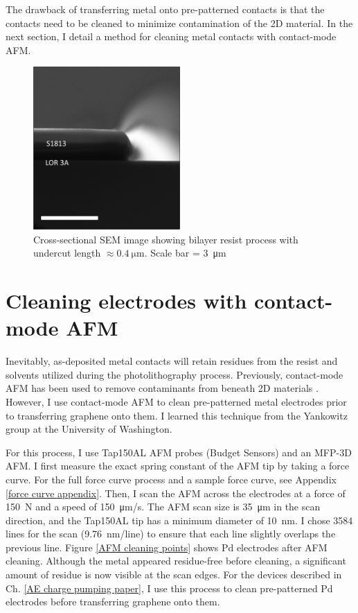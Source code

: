 \documentclass[double,12pt,1in]{beavtex}
\begin{document}
The drawback of transferring metal onto pre-patterned contacts is that the contacts need to be cleaned to minimize contamination of the 2D material. In the next section, I detail a method for cleaning metal contacts with contact-mode AFM.

\begin{figure}
    \includegraphics[width = 0.5\textwidth]{LOR cross section.png}
    \caption{Cross-sectional SEM image showing bilayer resist process with undercut length $\approx \SI{0.4}{\micro\meter}$. Scale bar = \SI{3}{\micro\meter}}
    \label{fig:cross-section SEM}
\end{figure}

\section{Cleaning electrodes with contact-mode AFM} \label{AFM cleaning main section}
Inevitably, as-deposited metal contacts will retain residues from the resist and solvents utilized during the photolithography process. Previously, contact-mode AFM has been used to remove contaminants from beneath 2D materials \cite{goossens_mechanical_2012,chen_tip-based_2021}. However, I use contact-mode AFM to clean pre-patterned metal electrodes prior to transferring graphene onto them. I learned this technique from the Yankowitz group at the University of Washington.

For this process, I use Tap150AL AFM probes (Budget Sensors) and an MFP-3D AFM. I first measure the exact spring constant of the AFM tip by taking a force curve. For the full force curve process and a sample force curve, see Appendix \ref{force curve appendix}. Then, I scan the AFM across the electrodes at a force of \SI{150}{N} and a speed of \SI{150}{\micro\meter/\second}. The AFM scan size is \SI{35}{\micro\meter} in the scan direction, and the Tap150AL tip has a minimum diameter of \SI{10}{\nano\meter}. I chose 3584 lines for the scan (\SI{9.76}{\nano\meter/line}) to ensure that each line slightly overlaps the previous line. Figure \ref{AFM cleaning points} shows Pd electrodes after AFM cleaning. Although the metal appeared residue-free before cleaning, a significant amount of residue is now visible at the scan edges. For the devices described in Ch. \ref{AE charge pumping paper}, I use this process to clean pre-patterned Pd electrodes before transferring graphene onto them.
\end{document}
